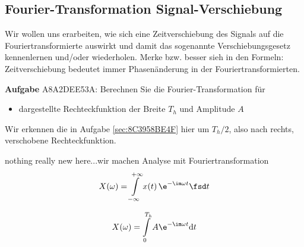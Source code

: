 \subsection{Fourier-Transformation Signal-Verschiebung}
\label{sec:A8A2DEE53A}
\begin{Ziel}
Wir wollen uns erarbeiten, wie sich eine Zeitverschiebung des Signals auf die
Fouriertransformierte auswirkt und damit das sogenannte Verschiebungsgesetz
kennenlernen und/oder wiederholen.
Merke bzw. besser sieh in den Formeln:
Zeitverschiebung bedeutet immer Phasenänderung in der Fouriertransformierten.
\end{Ziel}
\textbf{Aufgabe} {\tiny A8A2DEE53A}: Berechnen Sie die Fourier-Transformation für
\begin{itemize}
\item dargestellte Rechteckfunktion der Breite $T_h$ und Amplitude $A$
\end{itemize}
%
\begin{figure}[h!]
\centering
{}
\end{figure}
%
Wir erkennen die in Aufgabe \ref{sec:8C3958BE4F} hier um $T_h/2$, also nach rechts,
verschobene Rechteckfunktion.


\begin{Werkzeug}
nothing really new here...wir machen
Analyse mit Fouriertransformation
\begin{align}
X(\omega) = \int\limits_{-\infty}^{+\infty} x(t) \, \e^{-\im \omega t} \fsd t
\end{align}
\end{Werkzeug}
\begin{Ansatz}
\begin{equation}
X(\omega) = \int\limits_{0}^{T_h} A \e^{-\im \omega t} \mathrm{d}t
\end{equation}
\end{Ansatz}


